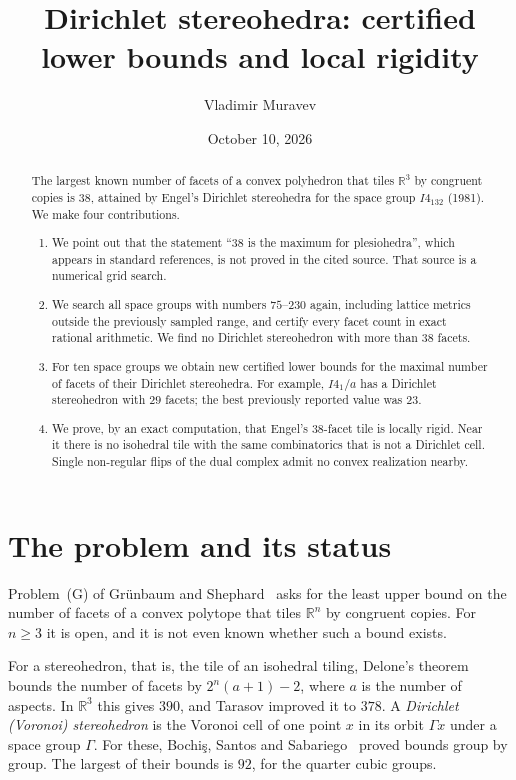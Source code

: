 \documentclass[11pt]{amsart}
\title{Dirichlet stereohedra: certified lower bounds and local rigidity}
\author{Vladimir Muravev}
\date{October 10, 2026}
\theoremstyle{definition}
\newcommand{\R}{\mathbb{R}}
\begin{document}
\begin{abstract}
The largest known number of facets of a convex polyhedron that tiles $\R^3$ by congruent copies is $38$, attained by
Engel's Dirichlet stereohedra for the space group $I4_132$ (1981). We make four contributions.
\begin{enumerate}[leftmargin=1.5em]
\item We point out that the statement ``$38$ is the maximum for plesiohedra'', which appears in standard references,
is not proved in the cited source. That source is a numerical grid search.
\item We search all space groups with numbers $75$--$230$ again, including lattice metrics outside the previously
sampled range, and certify every facet count in exact rational arithmetic. We find no Dirichlet stereohedron with
more than $38$ facets.
\item For ten space groups we obtain new certified lower bounds for the maximal number of facets of their Dirichlet
stereohedra. For example, $I4_1/a$ has a Dirichlet stereohedron with $29$ facets; the best previously reported value
was $23$.
\item We prove, by an exact computation, that Engel's $38$-facet tile is locally rigid. Near it there is no isohedral
tile with the same combinatorics that is not a Dirichlet cell. Single non-regular flips of the dual complex admit no
convex realization nearby.
\end{enumerate}
\end{abstract}
\maketitle

\section{The problem and its status}
Problem~(G) of Gr\"unbaum and Shephard~\cite{GS80} asks for the least upper bound on the number of facets of a convex
polytope that tiles $\R^n$ by congruent copies. For $n\ge 3$ it is open, and it is not even known whether such a bound
exists.

For a stereohedron, that is, the tile of an isohedral tiling, Delone's theorem bounds the number of facets by
$2^n(a+1)-2$, where $a$ is the number of aspects. In $\R^3$ this gives $390$, and Tarasov improved it to $378$. A
\emph{Dirichlet (Voronoi) stereohedron} is the Voronoi cell of one point $x$ in its orbit $\Gamma x$ under a space group
$\Gamma$. For these, Bochi\c{s}, Santos and Sabariego~\cite{BS01,BS06,SS08,SS11} proved bounds group by group. The
largest of their bounds is $92$, for the quarter cubic groups.
\end{document}
